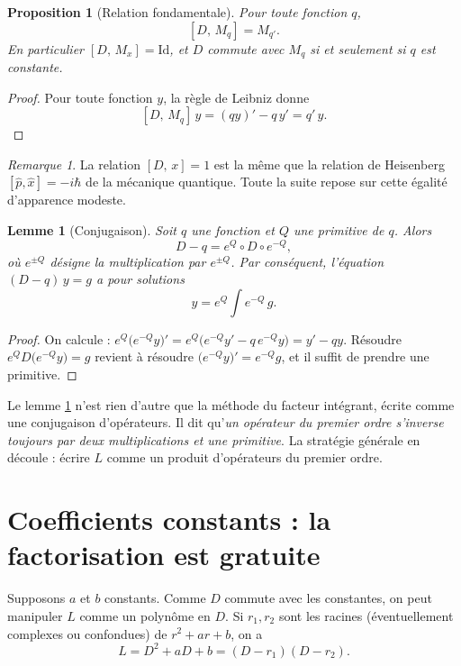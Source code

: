 \documentclass[11pt,a4paper]{article}
\theoremstyle{plain}
\newtheorem{proposition}[theoreme]{Proposition}
\newtheorem{lemme}[theoreme]{Lemme}
\theoremstyle{definition}
\theoremstyle{remark}
\newtheorem{remarque}[theoreme]{Remarque}
\newcommand{\Id}{\mathrm{Id}}
\newcommand{\Dx}{D}
\newcommand{\M}[1]{M_{#1}}
\newcommand{\cro}[2]{\left[#1,\,#2\right]}
\begin{document}
\begin{proposition}[Relation fondamentale]\label{prop:heisenberg}
Pour toute fonction $q$,
\[
  \cro{\Dx}{\M{q}} = \M{q'} .
\]
En particulier $\cro{\Dx}{\M{x}} = \Id$, et $\Dx$ commute avec $\M{q}$ si et seulement si $q$ est constante.
\end{proposition}

\begin{proof}
Pour toute fonction $y$, la règle de Leibniz donne
\[
  \cro{\Dx}{\M{q}}\,y = (qy)' - q\,y' = q'\,y .
\]
\end{proof}

\begin{remarque}
La relation $\cro{\Dx}{x}=1$ est la même que la relation de Heisenberg $[\hat p,\hat x] = -i\hbar$ de la mécanique quantique. Toute la suite repose sur cette égalité d'apparence modeste.
\end{remarque}

\begin{lemme}[Conjugaison]\label{lem:conj}
Soit $q$ une fonction et $Q$ une primitive de $q$. Alors
\[
  \Dx - q = e^{Q}\circ \Dx \circ e^{-Q},
\]
où $e^{\pm Q}$ désigne la multiplication par $e^{\pm Q}$. Par conséquent, l'équation $(\Dx - q)\,y = g$ a pour solutions
\[
  y = e^{Q}\!\int e^{-Q}\, g .
\]
\end{lemme}

\begin{proof}
On calcule : $e^{Q}\big(e^{-Q}y\big)' = e^{Q}\big(e^{-Q}y' - q\,e^{-Q}y\big) = y' - qy$. Résoudre $e^{Q}\Dx\big(e^{-Q}y\big) = g$ revient à résoudre $\big(e^{-Q}y\big)' = e^{-Q}g$, et il suffit de prendre une primitive.
\end{proof}

Le lemme \ref{lem:conj} n'est rien d'autre que la méthode du facteur intégrant, écrite comme une conjugaison d'opérateurs. Il dit qu'\emph{un opérateur du premier ordre s'inverse toujours par deux multiplications et une primitive}. La stratégie générale en découle : écrire $L$ comme un produit d'opérateurs du premier ordre.

\section{Coefficients constants : la factorisation est gratuite}

Supposons $a$ et $b$ constants. Comme $\Dx$ commute avec les constantes, on peut manipuler $L$ comme un polynôme en $\Dx$. Si $r_1, r_2$ sont les racines (éventuellement complexes ou confondues) de $r^2 + ar + b$, on a
\[
  L = \Dx^2 + a\Dx + b = (\Dx - r_1)(\Dx - r_2).
\]
\end{document}
